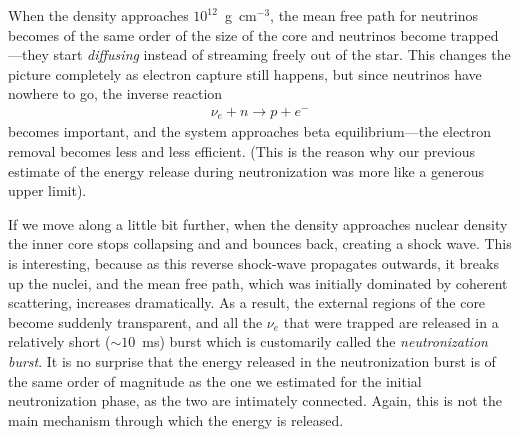 
When the density approaches $10^{12}$~g~cm$^{-3}$, the mean free path for neutrinos
becomes of the same order of the size of the core and neutrinos become trapped---they start \emph{diffusing}
instead of streaming freely out of the star. This changes the picture completely as
electron capture still happens, but since neutrinos have nowhere to go, the inverse
reaction
\begin{align*}
  \nu_e + n \rightarrow p + e^-
\end{align*}
becomes important, and the system approaches beta equilibrium---the electron removal
becomes less and less efficient. (This is the reason why our previous estimate of the
energy release during neutronization was more like a generous upper limit).


If we move along a little bit further, when the density approaches nuclear density
the inner core stops collapsing and and bounces back, creating a shock wave.
This is interesting, because as this reverse shock-wave propagates outwards, it
breaks up the nuclei, and the mean free path, which was initially dominated by
coherent scattering, increases dramatically. As a result, the external regions
of the core become suddenly transparent, and all the $\nu_e$ that were trapped
are released in a relatively short ($\sim 10$~ms) burst which is customarily
called the \emph{neutronization burst}. It is no surprise that the energy released
in the neutronization burst is of the same order of magnitude as the one we
estimated for the initial neutronization phase, as the two are intimately connected.
Again, this is not the main mechanism through which the energy is released.

